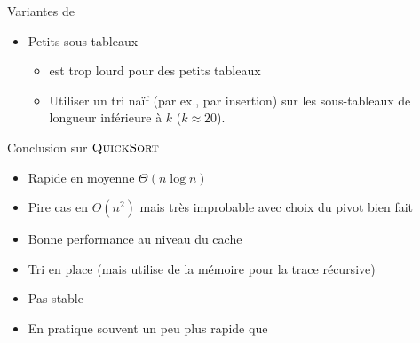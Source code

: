 \begin{frame}{Variantes de }

\begin{itemize}
\item Petits sous-tableaux
\begin{itemize}
\item {} est trop lourd pour des petits tableaux
\item Utiliser un tri naïf (par ex., par insertion) sur les sous-tableaux de longueur inférieure à $k$ ($k\approx 20$).
\end{itemize}
\end{itemize}

\begin{small}
\begin{center}

\end{center}
\end{small}

\end{frame}

\begin{frame}{Conclusion sur $\textnormal{\scshape QuickSort}$}

\begin{itemize}
\item Rapide en moyenne $\Theta(n\log n)$
\item Pire cas en $\Theta(n^2)$ mais très improbable avec choix du pivot bien fait
\item Bonne performance au niveau du cache
\item Tri \alert{en place} (mais utilise de la mémoire pour la trace récursive)
\item \alert{Pas stable}
\item En pratique souvent un peu plus rapide que 
\end{itemize}

\end{frame}


